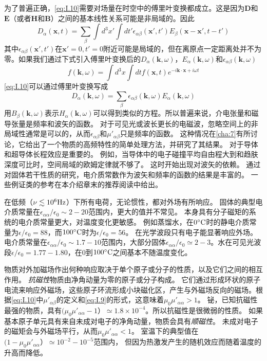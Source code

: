 \documentclass[12pt]{book}
\def\Celcius{^{\circ}{\rm C}}
\numberwithin{equation}{chapter}
\numberwithin{figure}{chapter}
\numberwithin{footnote}{page}
\begin{document}
{\small 为了普遍正确，\autoref{eq:I.10}需要对场量在时空中的傅里叶变换都成立。这是因为$\mathbf{D}$和$\mathbf{E}$（或者$\mathbf{H}$和$\mathbf{B}$）之间的基本线性关系可能是非局域的。因此
$$D_{\alpha}(\mathbf{x},t)=\sum_{\beta}\int d^3 x' \int dt' \epsilon_{\alpha\beta}(\mathbf{x'},t')E_{\beta}(\mathbf{x}-\mathbf{x'},t-t')$$
其中$\epsilon_{\alpha\beta}(\mathbf{x'},t')$在$\mathbf{x'}=0,t'=0$附近可能是局域的，但在离原点一定距离处并不为零。如果我们通过下式引入傅里叶变换后的$D_{\alpha}(\mathbf{k},\omega)$，$E_{\alpha}(\mathbf{k},\omega)$和$\epsilon_{\alpha\beta}(\mathbf{k},\omega)$
$$f(\mathbf{k},\omega)=\int d^3x \int dt f(\mathbf{x},t)e^{-i\mathbf{k}\cdot\mathbf{x}+i\omega t}$$
\autoref{eq:I.10}可以通过傅里叶变换写成
\begin{equation}\label{eq:I.11}
    D_{\alpha}(\mathbf{k},\omega)=\sum_{\beta}\epsilon_{\alpha\beta}(\mathbf{k},\omega)E_{\alpha}(\mathbf{k},\omega)
\end{equation}
用$B_{\beta}(\mathbf{k},\omega)$表示$H_{\alpha}(\mathbf{k},\omega)$可以得到类似的方程。所以普遍来说，介电张量和磁导张量是频率和波矢的函数。
对于可见光或波长更长的电磁波，忽略空间上的非局域性通常是可以的，从而$\epsilon_{\alpha\beta}$和$\mu'_{\alpha\beta}$只是频率的函数。
这种情况在\autoref{cha:7}有所讨论，它给出了一个物质的高频特性的简单处理方法，并研究了其结果。
对于导体和超导体长程效应是重要的。
例如，当导体中的电子碰撞平均自由程大到和趋肤深度可比时，空间局域的欧姆定律就不够了。
这时开始出现对波矢的依赖。
通过对固体若干性质的研究，电介质常数作为波矢和频率的函数的结果是丰富的。
一些例证类的参考在本介绍章末的推荐阅读中给出。}

在低频（$\nu \lesssim 10^6 {\rm Hz}$）下所有电荷，无论惯性，都对外场有所响应。
固体的典型电介质常量在$\epsilon_{\alpha\alpha}/\epsilon_0\sim 2-20$范围内，更大的值并不常见。
本身具有分子磁矩的系统的电介质常量更大，对温度变化更敏感。
例如蒸馏水，在$0\Celcius$时的静电介质常量为$\epsilon/\epsilon_0=88$，而$100\Celcius$时为$\epsilon/\epsilon_0=56$。
在光学波段只有电子能显著响应外场。电介质常量在$\epsilon_{\alpha\alpha}/\epsilon_0\sim 1.7-10$范围内，大部分固体$\epsilon_{\alpha\alpha}/\epsilon_0\simeq 2-3$。水在可见光波段$\epsilon/\epsilon_0=1.77-1.80$，在$0$到$100\Celcius$之间基本不随温度变化。

物质对外加磁场作出何种响应取决于单个原子或分子的性质，以及它们之间的相互作用。
\textit{抗磁性}物质由净角动量为零的原子或分子构成。
它们通过形成环状的原子电流来响应外磁场，这些原子环流形成小块磁化区，产生与外磁场反向的磁场。根据\autoref{eq:I.10}中$\mu'_{\alpha\beta}$的定义和\autoref{eq:I.9}的形式，这意味着$\mu_0\mu'_{\alpha\alpha}>1$。
铋，已知抗磁性最强的物质，具有$(\mu_0\mu'_{\alpha\alpha}-1）\simeq 1.8\times 10^{-4}$。所以抗磁性是很微弱的性质。
如果基本原子单元具有来自未成对电子的净角动量，物质会具有\textit{顺磁性}。
未成对电子的磁矩会与外磁场平行，从而$\mu_0\mu'_{\alpha\alpha}<1$。
室温下的典型值在$(1-\mu_0\mu'_{\alpha\alpha}）\simeq 10^{-2}-10^{-5}$范围内，
但因为热激发产生的随机效应而随着温度的升高而降低。
\end{document}
